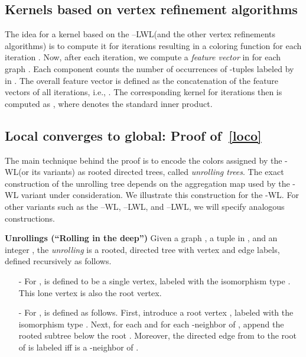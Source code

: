 \documentclass{article}
\newcommand{\xhdr}[1]{{\noindent\bfseries #1}}
\theoremstyle{definition}
\newcommand{\new}[1]{\emph{#1}}
\newcommand{\kwl}{-\textsf{WL}\xspace}
\newcommand{\deltakwl}{--\textsf{WL}\xspace}
\newcommand{\localkwl}{--\textsf{LWL}\xspace}
\newcommand{\pluskwl}{--\textsf{LWL}\xspace}
\begin{document}
\subsection{Kernels based on vertex refinement algorithms}

The idea for a kernel based on the \localkwl (and the other vertex refinements algorithms) is to compute it for  iterations resulting in a coloring function  for each iteration . Now, after each iteration, we compute a \new{feature vector}  in  for each graph . Each component  counts the number of occurrences of -tuples labeled by  in . The overall feature vector  is defined as the concatenation of the feature vectors of all  iterations, i.e., . The corresponding kernel for  iterations then is computed as  , where  denotes the standard inner product.

\subsection{Local converges to global: Proof of~\cref{loco}}\label{locodes}

The main technique behind the proof is to encode the colors assigned by the \kwl (or its variants) as rooted directed trees, called \emph{unrolling trees}. 
The exact construction of the unrolling tree depends on the aggregation map  used by the \kwl variant under consideration. 
We illustrate this construction for the \kwl. For other variants such as the \deltakwl, \localkwl, and \pluskwl, we will specify analogous constructions. 

\xhdr{Unrollings (``Rolling in the deep'')} Given a graph , a tuple  in , and an integer , 
the \emph{unrolling}  is a rooted, directed tree with vertex and edge labels, defined recursively as follows. 
\begin{itemize}
	\item[-] For ,  is defined to be a single vertex, labeled with the isomorphism type .  
	This lone vertex is also the root vertex.
	
	\item[-] For ,  is defined as follows. 
	First, introduce a root vertex , labeled with the isomorphism type .
	Next, for each  and for each -neighbor  of , 
	append the rooted subtree  below the root . 
	Moreover, the directed edge  from  to the root of  is labeled  iff  is a -neighbor of . 
	
\end{itemize}
\end{document}
